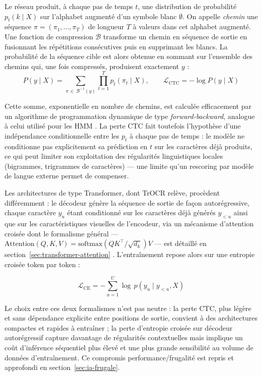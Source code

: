 Le réseau produit, à chaque pas de temps $t$, une distribution de probabilité
$p_t(k \mid X)$ sur l'alphabet augmenté d'un symbole \og blanc \fg{} $\emptyset$.
On appelle \textit{chemin} une séquence $\pi = (\pi_1, \dots, \pi_T)$ de longueur $T$ à valeurs dans cet alphabet augmenté.
Une fonction de compression $\mathcal{B}$ transforme un chemin en séquence de sortie en fusionnant les répétitions consécutives puis en supprimant les blancs.
La probabilité de la séquence cible est alors obtenue en sommant sur l'ensemble des chemins qui, une fois compressés, produisent exactement $y$ :
\begin{equation}
    P(y \mid X) = \sum_{\pi \,\in\, \mathcal{B}^{-1}(y)} \prod_{t=1}^{T} p_t(\pi_t
    \mid X), \qquad \mathcal{L}_{\mathrm{CTC}} = -\log P(y \mid X)
\end{equation}

Cette somme, exponentielle en nombre de chemins, est calculée efficacement par un algorithme de programmation dynamique de type \textit{forward-backward}, analogue à celui utilisé pour les HMM \cite{graves2006ctc}.
La perte CTC fait toutefois l'hypothèse d'une indépendance conditionnelle entre les $p_t$ à chaque pas de temps : le modèle ne conditionne pas explicitement sa prédiction en $t$ sur les caractères déjà produits, ce qui peut limiter son exploitation des régularités linguistiques locales (bigrammes, trigrammes de caractères) --- une limite qu'un \og rescoring \fg{} par modèle de langue externe permet de compenser.

Les architectures de type Transformer, dont TrOCR relève, procèdent
différemment : le décodeur génère la séquence de sortie de façon autorégressive, chaque caractère $y_u$ étant conditionné sur les caractères déjà générés $y_{<u}$ ainsi que sur les caractéristiques visuelles de l'encodeur, via un mécanisme d'attention croisée dont le formalisme général --- $\mathrm{Attention}(Q,K,V) = \mathrm{softmax}\!\left(QK^\top / \sqrt{d_k}\right)V$
--- est détaillé en section~\ref{sec:transformer-attention} \cite{vaswani2017attention}. L'entraînement
repose alors sur une entropie croisée token par token :

\begin{equation}
    \mathcal{L}_{\mathrm{CE}} = -\sum_{u=1}^{U} \log\, p\!\left(y_u \mid y_{<u},
    X\right)
\end{equation}

Le choix entre ces deux formalismes n'est pas neutre : la perte CTC, plus légère et sans dépendance explicite entre positions de sortie, convient à des architectures compactes et rapides à entraîner ; la perte d'entropie croisée sur décodeur autorégressif capture davantage de régularités contextuelles mais implique un coût d'inférence séquentiel plus élevé et une plus grande sensibilité au volume de données d'entraînement. Ce compromis performance/frugalité est repris et approfondi en section~\ref{sec:ia-frugale}.

